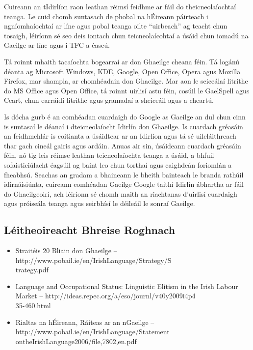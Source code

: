 \documentclass[]{../../metanetpaper}
\begin{document}
\begin{multicols}{2}
Cuireann an tIdirlíon raon leathan réimsí feidhme ar fáil do theicneolaíochtaí teanga. Le cuid chomh suntasach de phobal na hÉireann páirteach i ngníomhaíochtaí ar líne agus pobal teanga oilte ``uirbeach'' ag teacht chun tosaigh, léiríonn sé seo deis iontach chun teicneolaícohtaí a úsáid chun iomadú na Gaeilge ar líne agus i TFC a éascú.


Tá roinnt mhaith tacaíochta bogearraí ar don Ghaeilge cheana féin.  Tá logánú déanta ag Microsoft Windows, KDE, Google, Open Office, Opera agus Mozilla Firefox, mar shampla, ar chomhéadain don Ghaeilge. Mar aon le seiceálaí litrithe do MS Office agus Open Office, tá roinnt uirlisí astu féin, cosúil le GaelSpell agus Ceart, chun earráidí litrithe agus gramadaí a sheiceáil agus a cheartú.

Is dócha gurb é an comhéadan cuardaigh do Google as Gaeilge an dul chun cinn is suntasaí le déanaí i dteicneolaíocht Idirlín don Ghaeilge. Is cuardach gréasáin an feidhmchlár is coitianta a úsáidtear ar an Idirlíon agus tá sé uileláithreach thar gach cineál gairis agus ardáin. Anuas air sin, úsáideann cuardach gréasáin féin, nó tig leis réimse leathan teicneolaíochta teanga a úsáid, a bhfuil sofaisticiúlacht éagsúil ag baint leo chun torthaí agus caighdeán foriomlán a fheabhsú. Seachas an gradam a bhaineann le bheith bainteach le branda rathúil idirnáisiúnta, cuireann comhéadan Gaeilge Google taithí Idirlín ábhartha ar fáil do Ghaeilgeoirí, ach léiríonn sé chomh maith an riachtanas d’uirlisí cuardaigh agus próiseála teanga agus seirbhísí le déileáil le sonraí Gaeilge.

\subsection{Léitheoireacht Bhreise Roghnach}

\begin{itemize}
\item Straitéis 20 Bliain don Ghaeilge -- http://www.pobail.ie/en/IrishLanguage/Strategy/S\\trategy.pdf
\item Language and Occupational Status: Linguistic Elitism in the Irish Labour Market -- http://ideas.repec.org/a/eso/journl/v40y2009i4p4\\35-460.html
\item Rialtas na hÉireann, Ráiteas ar an nGaeilge -- http://www.pobail.ie/en/IrishLanguage/Statement\\ontheIrishLanguage2006/file,7802,en.pdf
\end{itemize}

\end{multicols}
\end{document}
